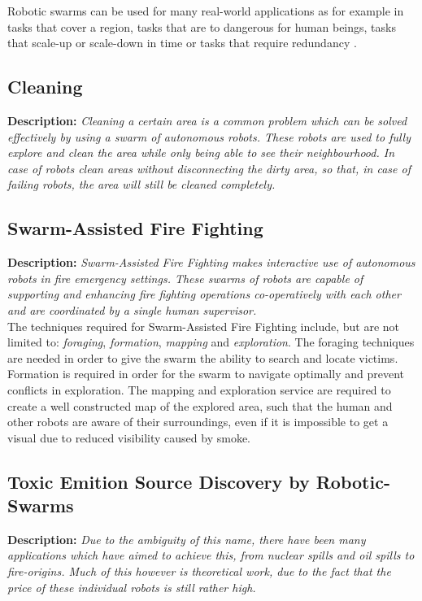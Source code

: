 Robotic swarms can be used for many real-world applications as for example in tasks that cover a region, tasks that are to dangerous for human beings, tasks that scale-up or scale-down in time or tasks that require redundancy \cite{csahin2005swarm}.

\subsection{Cleaning}
  \textbf{Description: }\emph{Cleaning a certain area is a common problem which can be solved effectively by using a swarm of autonomous robots. These robots are used to fully explore and clean the area while only being able to see their neighbourhood. In case of \cite{altshuler2005swarm} robots clean areas without disconnecting the dirty area, so that, in case of failing robots, the area will still be cleaned completely.} \cite{altshuler2005swarm,wagner2008cooperative}
  
  \subsection{Swarm-Assisted Fire Fighting}
  \textbf{Description: }\emph{Swarm-Assisted Fire Fighting makes interactive use of autonomous robots in fire emergency settings. These swarms of robots are capable of supporting and enhancing fire fighting operations co-operatively with each other and are coordinated by a single human supervisor.}\cite{Naghsh2008,Penders2011}\\

  The techniques required for Swarm-Assisted Fire Fighting include, but are not limited to: \emph{foraging}, \emph{formation}, \emph{mapping} and \emph{exploration}.\cite{Naghsh2008,Penders2011} The foraging techniques are needed in order to give the swarm the ability to search and locate victims. Formation is required in order for the swarm to navigate optimally and prevent conflicts in exploration. The mapping and exploration service are required to create a well constructed map of the explored area, such that the human and other robots are aware of their surroundings, even if it is impossible to get a visual due to reduced visibility caused by smoke.

  \subsection{Toxic Emition Source Discovery by Robotic-Swarms}
  \textbf{Description: }\emph{Due to the ambiguity of this name, there have been many applications which have aimed to achieve this, from nuclear spills and oil spills to fire-origins. Much of this however is theoretical work, due to the fact that the price of these individual robots is still rather high.}

